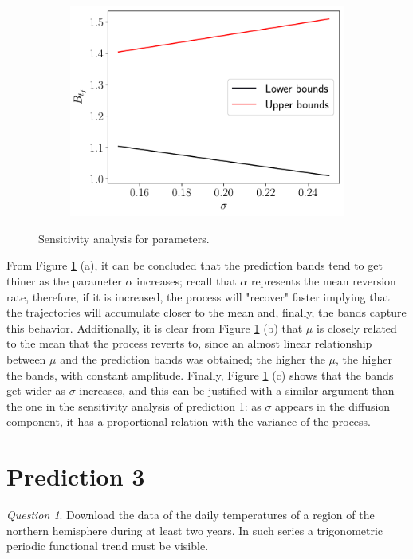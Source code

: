 \documentclass[11pt]{article}
\theoremstyle{definition}
\theoremstyle{remark}
\theoremstyle{remark}
\newtheorem{question}{Question}
\begin{document}
\begin{figure}[H]
\begin{subfigure}[b]{0.45\textwidth}
      \caption{}
  \end{subfigure}
  \begin{subfigure}[b]{0.45\textwidth}
      \centering
      \includegraphics[scale=0.45]{sigma_sens}
      \caption{}
  \end{subfigure}
  \caption{Sensitivity analysis for parameters.}
  \label{fig:anal2}
\end{figure}

From Figure \ref{fig:anal2} (a), it can be concluded that the prediction bands
tend to get thiner as the parameter $\alpha$ increases; recall that $\alpha$
represents the mean reversion rate, therefore, if it is increased, the process
will "recover" faster implying that the trajectories will accumulate
closer to the mean and, finally, the bands capture this behavior. Additionally,
it is clear from Figure \ref{fig:anal2} (b) that $\mu$ is closely related to
the mean that the process reverts to, since an almost linear relationship
between $\mu$ and the prediction bands was obtained; the higher the $\mu$,
the higher the bands, with constant amplitude. Finally, Figure \ref{fig:anal2} (c)
shows that the bands get wider as $\sigma$ increases, and this can be justified
with a similar argument than the one in the sensitivity analysis of prediction
1: as $\sigma$ appears in the diffusion component, it has a proportional
relation with the variance of the process.

\section*{Prediction 3}
\begin{question}
  Download the data of the daily temperatures of a region of the
  northern hemisphere during at least two years. In such series a
  trigonometric periodic functional trend must be visible.
\end{question}
\end{document}
